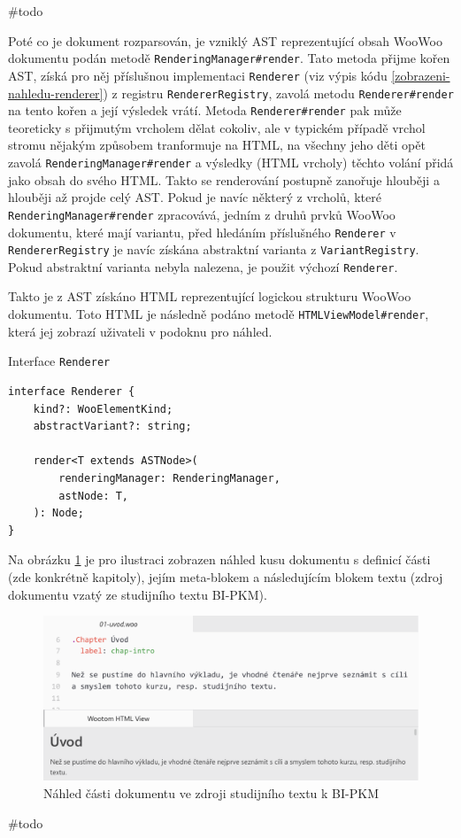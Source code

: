 \#todo

\begin{sloppypar}
Poté co je dokument rozparsován, je vzniklý AST reprezentující obsah WooWoo dokumentu podán metodě
\texttt{RenderingManager#render}. Tato metoda přijme kořen AST, získá pro něj příslušnou implementaci
\texttt{Renderer} (viz výpis kódu \ref{zobrazeni-nahledu-renderer}) z registru
\texttt{RendererRegistry}, zavolá metodu \texttt{Renderer#render} na tento kořen a její výsledek
vrátí. Metoda \texttt{Renderer#render} pak může teoreticky s přijmutým vrcholem dělat cokoliv, ale v typickém
případě vrchol stromu nějakým způsobem tranformuje na HTML, na všechny jeho děti opět zavolá
\texttt{RenderingManager#render} a výsledky (HTML vrcholy) těchto volání přidá jako obsah do svého HTML. Takto
se renderování postupně zanořuje hlouběji a hlouběji až projde celý AST. Pokud je navíc některý z vrcholů, které
\texttt{RenderingManager#render} zpracovává, jedním z druhů prvků WooWoo dokumentu, které mají variantu,
před hledáním příslušného \texttt{Renderer} v \texttt{RendererRegistry} je navíc získána abstraktní
varianta z \texttt{VariantRegistry}. Pokud abstraktní varianta nebyla nalezena, je použit výchozí
\texttt{Renderer}.
\end{sloppypar}

\begin{sloppypar}
Takto je z AST získáno HTML reprezentující logickou strukturu WooWoo dokumentu. Toto HTML je následně podáno metodě
\texttt{HTMLViewModel#render}, která jej zobrazí uživateli v podoknu pro náhled.
\end{sloppypar}

\begin{listing}
    \caption{Interface \texttt{Renderer}}
    \label{zobrazeni-nahledu-renderer}
    \begin{verbatim}
interface Renderer {
    kind?: WooElementKind;
    abstractVariant?: string;

    render<T extends ASTNode>(
        renderingManager: RenderingManager,
        astNode: T,
    ): Node;
}
    \end{verbatim}
\end{listing}

Na obrázku \ref{zobrazeni-nahledu-pkm-kapitola} je pro ilustraci zobrazen náhled kusu dokumentu s definicí části (zde
konkrétně kapitoly), jejím meta-blokem a následujícím blokem textu (zdroj dokumentu vzatý ze studijního textu BI-PKM).

\begin{figure}\centering
    \includegraphics[width=1.0\textwidth]{content/realizace/nahled-pkm-kapitola}
 	\caption[Náhled části dokumentu]{Náhled části dokumentu ve zdroji studijního textu k BI-PKM \cite{pkm}}
    \label{zobrazeni-nahledu-pkm-kapitola}
\end{figure}

\#todo
